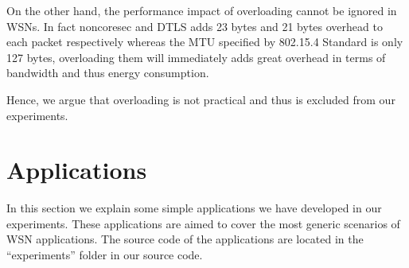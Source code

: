 On the other hand, the performance impact of overloading cannot be ignored in WSNs. In fact noncoresec and DTLS adds 23 bytes and 21 bytes overhead to each packet respectively whereas the MTU specified by 802.15.4 Standard is only 127 bytes, overloading them will immediately adds great overhead in terms of bandwidth and thus energy consumption. 

Hence, we argue that overloading is not practical and thus is excluded from our experiments.

\section{Applications} \label{Sec: Applications}

In this section we explain some simple applications we have developed in our experiments. These applications are aimed to cover the most generic scenarios of WSN applications. The source code of the applications are located in the ``experiments'' folder in our source code. 

